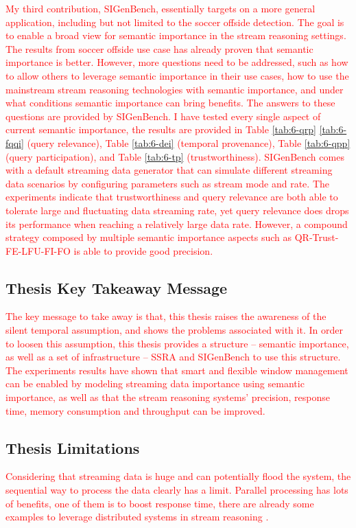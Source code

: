\textcolor{red}{
My third contribution, SIGenBench, essentially targets on a more general application, including but not limited to the soccer offside detection. 
The goal is to enable a broad view for semantic importance in the stream reasoning settings. 
The results from soccer offside use case has already proven that semantic importance is better. 
However, more questions need to be addressed, such as how to allow others to leverage semantic importance in their use cases, how to use the mainstream stream reasoning technologies with semantic importance, and under what conditions semantic importance can bring benefits. 
The answers to these questions are provided by SIGenBench. 
I have tested every single aspect of current semantic importance, the results are provided in Table \ref{tab:6-qrp} \ref{tab:6-fqqi} (query relevance), Table \ref{tab:6-dei} (temporal provenance), Table \ref{tab:6-qpp} (query participation), and Table \ref{tab:6-tp} (trustworthiness). 
SIGenBench comes with a default streaming data generator that can simulate different streaming data scenarios by configuring parameters such as stream mode and rate. 
The experiments indicate that trustworthiness and query relevance are both able to tolerate large and fluctuating data streaming rate, yet query relevance does drops its performance when reaching a relatively large data rate. 
However, a compound strategy composed by multiple semantic importance aspects such as QR-Trust-FE-LFU-FI-FO is able to provide good precision.
}
%
\subsection{Thesis Key Takeaway Message}
\textcolor{red}{
The key message to take away is that, this thesis raises the awareness of the silent temporal assumption, and shows the problems associated with it. 
In order to loosen this assumption, this thesis provides a structure -- semantic importance, as well as a set of infrastructure -- SSRA and SIGenBench to use this structure. 
The experiments results have shown that smart and flexible window management can be enabled by modeling streaming data importance using semantic importance, as well as that the stream reasoning systems' precision, response time, memory consumption and throughput can be improved.
}
%
\subsection{Thesis Limitations}
\textcolor{red}{
Considering that streaming data is huge and can potentially flood the system, the sequential way to process the data clearly has a limit. 
Parallel processing has lots of benefits, one of them is to boost response time, there are already some examples to leverage distributed systems in stream reasoning \cite{hoeksema2011high} \cite{liu2014efficient}. 
}

